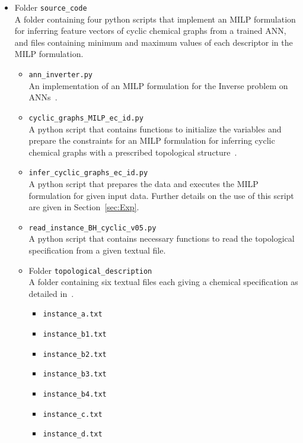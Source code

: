 \documentclass[11pt, titlepage, dvipdfmx, twoside]{article}
\begin{document}
\begin{itemize}

\item Folder {\tt source\_code}\\
A folder containing four python scripts that implement
an MILP formulation for inferring feature vectors
of cyclic chemical graphs from a trained ANN,
and files containing minimum and maximum values
of each descriptor
in the MILP formulation.

\begin{itemize}

\item {\tt ann\_inverter.py}\\
An implementation of an MILP formulation 
for the Inverse problem on  ANNs~\cite{AN19}.

\item {\tt cyclic\_graphs\_MILP\_ec\_id.py}\\
A python script that contains functions to initialize the variables and prepare 
the constraints for an MILP
formulation for inferring cyclic chemical graphs with 
a prescribed topological structure~\cite{cyclic_BH_arxiv}.

\item {\tt infer\_cyclic\_graphs\_ec\_id.py}\\
A python script that prepares the data and executes 
the MILP formulation for given input data.
Further details on the use of this script
are given in Section~\ref{sec:Exp}.

\item {\tt read\_instance\_BH\_cyclic\_v05.py}\\
A python script that contains necessary functions
to read the topological specification from a given textual file.

\item Folder {\tt topological\_description}\\
A folder containing six textual files each giving a chemical specification as detailed 
in~\cite{cyclic_BH_arxiv}.
%
\begin{itemize}
 \item {\tt instance\_a.txt} 
 \item {\tt instance\_b1.txt} 
 \item {\tt instance\_b2.txt} 
 \item {\tt instance\_b3.txt}
 \item {\tt instance\_b4.txt}  
 \item {\tt instance\_c.txt} 
 \item {\tt instance\_d.txt} 
\end{itemize}


\end{itemize}
\end{itemize}
\end{document}
